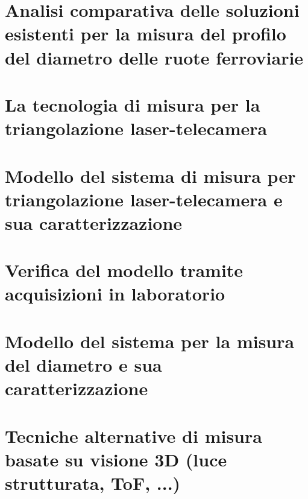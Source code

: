 \section{Analisi comparativa delle soluzioni esistenti per la misura del profilo del diametro delle ruote ferroviarie}
\section{La tecnologia di misura per la triangolazione laser-telecamera}
\section{Modello del sistema di misura per triangolazione laser-telecamera e sua caratterizzazione}
\section{Verifica del modello tramite acquisizioni in laboratorio}
\section{Modello del sistema per la misura del diametro e sua caratterizzazione}
\section{Tecniche alternative di misura basate su visione 3D (luce strutturata, ToF, ...)}

